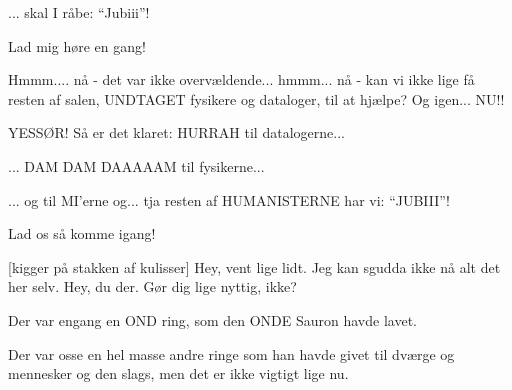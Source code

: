 \documentclass[a4paper,11pt]{article}
\begin{document}
\begin{sketch}

   ... skal I råbe: ``Jubiii''!

   Lad mig høre en gang!


   Hmmm.... nå - det var ikke overvældende... hmmm... nå -
  kan vi ikke lige få resten af salen, UNDTAGET fysikere og dataloger,
  til at hjælpe? Og igen... NU!!


   YESSØR! Så er det klaret: HURRAH til datalogerne...


   ... DAM DAM DAAAAAM til fysikerne...


   ... og til MI'erne og... tja resten af HUMANISTERNE har
  vi: ``JUBIII''!


   Lad os så komme igang!
  
  [kigger på stakken af kulisser] Hey, vent lige lidt. Jeg kan sgudda
  ikke nå alt det her selv.  Hey, du der. Gør dig lige
  nyttig, ikke? 
  

  


   Der var engang en OND ring, som den ONDE Sauron havde
  lavet.

   

   Der var osse en hel masse andre ringe som han havde givet
  til dværge og mennesker og den slags, men det er ikke vigtigt lige
  nu.




\end{sketch}
\end{document}
